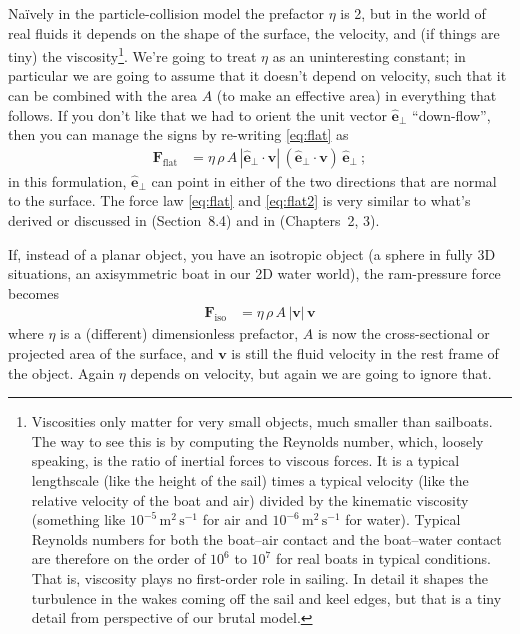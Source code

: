 \documentclass[letterpaper]{article}
\renewcommand{\vec}[1]{\boldsymbol{#1}}
\newcommand{\uvec}{\vec{\hat{e}}}
\renewcommand{\flat}{\text{flat}}
\newcommand{\iso}{\text{iso}}
\newcommand{\mmps}{\mathrm{m^2\,s^{-1}}}
\begin{document}
Na\"ively in the particle-collision model the prefactor $\eta$ is 2, but in the world of real fluids it depends on the shape of the surface, the velocity, and (if things are tiny) the viscosity\footnote{%
Viscosities only matter for very small objects, much smaller than sailboats. The way to see this is by computing the Reynolds number, which, loosely speaking, is the ratio of inertial forces to viscous forces. It is a typical lengthscale (like the height of the sail) times a typical velocity (like the relative velocity of the boat and air) divided by the kinematic viscosity (something like $10^{-5}\,\mmps$ for air and $10^{-6}\,\mmps$ for water). Typical Reynolds numbers for both the boat--air contact and the boat--water contact are therefore on the order of $10^6$ to $10^7$ for real boats in typical conditions. That is, viscosity plays no first-order role in sailing. In detail it shapes the turbulence in the wakes coming off the sail and keel edges, but that is a tiny detail from perspective of our brutal model.}.
We're going to treat $\eta$ as an uninteresting constant; in particular we are going to assume that it doesn't depend on velocity, such that it can be combined with the area $A$ (to make an effective area) in everything that follows.
If you don't like that we had to orient the unit vector $\uvec_\perp$ ``down-flow'', then you can manage the signs by re-writing \eqref{eq:flat} as
\begin{align}\label{eq:flat2}
    \vec{F}_\flat &= \eta\,\rho\,A\,|\uvec_\perp\cdot\vec{v}|\,(\uvec_\perp\cdot\vec{v})\,\uvec_\perp ~;
\end{align}
in this formulation, $\uvec_\perp$ can point in either of the two directions that are normal to the surface.
The force law \eqref{eq:flat} and \eqref{eq:flat2} is very similar to what's derived or discussed in \cite{symmetry} (Section~8.4) and in \cite{pos} (Chapters~2, 3).

If, instead of a planar object, you have an isotropic object (a sphere in fully 3D situations, an axisymmetric boat in our 2D water world), the ram-pressure force becomes
\begin{align}\label{eq:iso}
    \vec{F}_\iso &= \eta\,\rho\,A\,|\vec{v}|\,\vec{v}
\end{align}
where $\eta$ is a (different) dimensionless prefactor, $A$ is now the cross-sectional or projected area of the surface, and $\vec{v}$ is still the fluid velocity in the rest frame of the object.
Again $\eta$ depends on velocity, but again we are going to ignore that.
\end{document}
